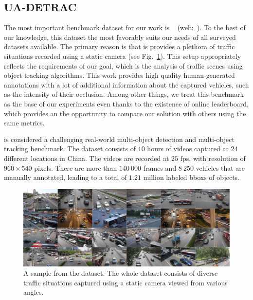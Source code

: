 \subsection{UA-DETRAC}
\label{ssec:DatasetUADETRAC}

The most important benchmark dataset for our work is ~\cite{CVIU_UA-DETRAC} (web:~\cite{uadetracdataset}). To the best of our knowledge, this dataset the most favorably suits our needs of all surveyed datasets available. The primary reason is that is provides a plethora of traffic situations recorded using a static camera (see Fig.~\ref{fig:DatasetUADETRAC}). This setup appropriately reflects the requirements of our goal, which is the analysis of traffic scenes using object tracking algorithms. This work provides high quality human-generated annotations with a lot of additional information about the captured vehicles, such as the intensity of their occlusion. Among other things, we treat this benchmark as the base of our experiments even thanks to the existence of online leaderboard, which provides an the opportunity to compare our solution with others using the same metrics.

 is considered a challenging real-world multi-object detection and multi-object tracking benchmark. The dataset consists of $10$ hours of videos captured at $24$ different locations in China. The videos are recorded at $25$ \gls{fps}, with resolution of $960 \times 540$ pixels. There are more than $140\ 000$ frames and $8\ 250$ vehicles that are manually annotated, leading to a total of $1.21$ million labeled \glspl{bbox} of objects.

\begin{figure}[t]
    \centerline{\includegraphics[width=\linewidth]{figures/datasets/uadetrac_samples.jpg}}
    \caption[ dataset]{A sample from the  dataset. The whole dataset consists of diverse traffic situations captured using a static camera viewed from various angles. }
    \label{fig:DatasetUADETRAC}
\end{figure}

